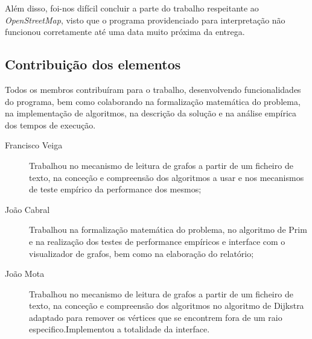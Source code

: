 \documentclass[a4paper,12pt,titlepage]{article}
\begin{document}
Além disso, foi-nos difícil concluir a parte do trabalho respeitante ao \emph{OpenStreetMap}, visto que o programa providenciado para interpretação não funcionou corretamente até uma data muito próxima da entrega.
\subsection{Contribuição dos elementos}
Todos os membros contribuíram para o trabalho, desenvolvendo funcionalidades do programa, bem como colaborando na formalização matemática do problema, na implementação de algoritmos, na descrição da solução e na análise empírica dos tempos de execução.
\begin{description}
\item[Francisco Veiga] Trabalhou no mecanismo de leitura de grafos a partir de um ficheiro de texto, na conceção e compreensão dos algoritmos a usar e nos mecanismos de teste empírico da performance dos mesmos;
\item[João Cabral] Trabalhou na formalização matemática do problema, no algoritmo de Prim e na realização dos testes de performance empíricos e interface com o visualizador de grafos, bem como na elaboração do relatório;
\item[João Mota] Trabalhou no mecanismo de leitura de grafos a partir de um ficheiro de texto, na conceção e compreensão dos algoritmos no algoritmo de Dijkstra adaptado para remover os vértices que se encontrem fora de um raio especifico.Implementou a totalidade da interface.


\end{description}

\newpage


\end{document}
